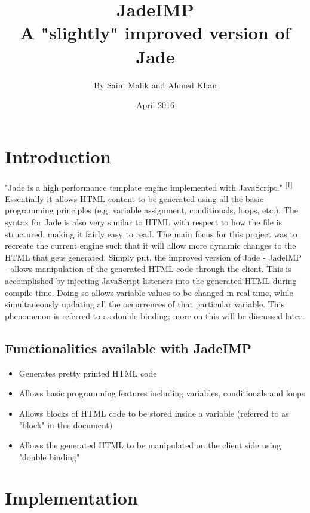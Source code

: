 \documentclass{article}
\begin{document}
\title{JadeIMP \\ \large A "slightly" improved version of Jade}
\author{By Saim Malik and Ahmed Khan }
\date{April 2016}

\maketitle

\section{Introduction}

"Jade is a high performance template engine implemented with JavaScript." \textsuperscript{[1]} Essentially it allows HTML content to be generated using all the basic programming principles (e.g. variable assignment, conditionals, loops, etc.). The syntax for Jade is also very similar to HTML with respect to how the file is structured, making it fairly easy to read. The main focus for this project was to recreate the current engine such that it will allow more dynamic changes to the HTML that gets generated. Simply put, the improved version of Jade - JadeIMP - allows manipulation of the generated HTML code through the client. This is accomplished by injecting JavaScript listeners into the generated HTML during compile time. Doing so allows variable values to be changed in real time, while simultaneously updating all the occurrences of that particular variable. This phenomenon is referred to as double binding; more on this will be discussed later.


\subsection{Functionalities available with JadeIMP}

\begin{itemize}
    \item Generates pretty printed HTML code
    \item Allows basic programming features including variables, conditionals and loops
    \item Allows blocks of HTML code to be stored inside a variable (referred to as "block" in this document)
    \item Allows the generated HTML to be manipulated on the client side using "double binding"
\end{itemize}


\section{Implementation}
\end{document}

